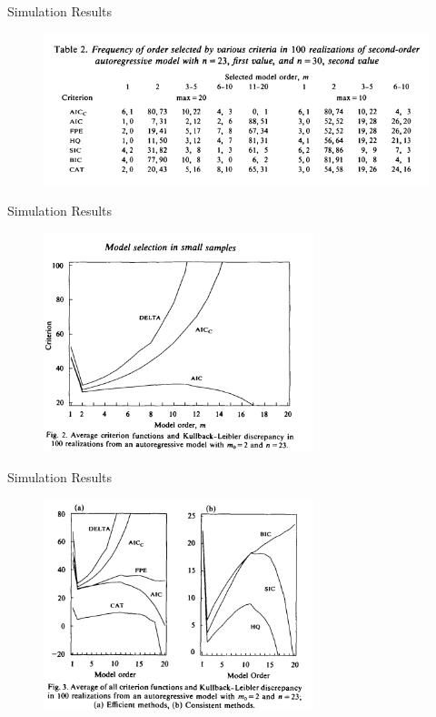 \documentclass[11pt]{beamer}
\begin{document}
\begin{frame}{Simulation Results}
\begin{figure}[htb]
        \centering
        \includegraphics[width=1\textwidth]{drive.google.com_file_d_15QZ0OuCAEpjZRO1xj0kAWJdI5QHMy-5W_view (3)}
        \medskip
    \end{figure}

\end{frame}

\begin{frame}{Simulation Results}
\begin{figure}[htb]
        \centering
        \includegraphics[width=0.7\textwidth]{drive.google.com_file_d_15QZ0OuCAEpjZRO1xj0kAWJdI5QHMy-5W_view (4)}
        \medskip
    \end{figure}
\end{frame}

\begin{frame}{Simulation Results}
\begin{figure}[htb]
        \centering
        \includegraphics[width=0.7\textwidth]{drive.google.com_file_d_15QZ0OuCAEpjZRO1xj0kAWJdI5QHMy-5W_view (5)}
        \medskip
    \end{figure}
\end{frame}
\end{document}
